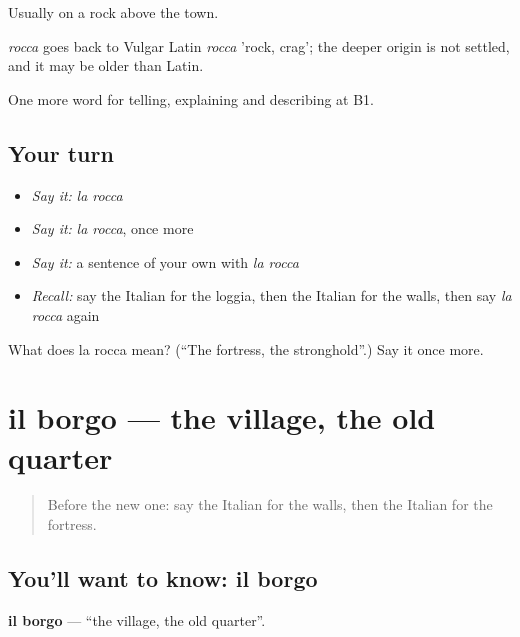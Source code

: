 Usually on a rock above the town.

\begin{cousinweb}
\emph{rocca} goes back to Vulgar Latin \emph{rocca} 'rock, crag'; the deeper origin is not settled, and it may be older than Latin.
\end{cousinweb}

\begin{grammarlens}[title={What you've built}]
One more word for telling, explaining and describing at B1.
\end{grammarlens}

\subsection*{Your turn}
\begin{itemize}
\raggedright
  \item \emph{Say it:} \emph{la rocca}
  \item \emph{Say it:} \emph{la rocca}, once more
  \item \emph{Say it:} a sentence of your own with \emph{la rocca}
  \item \emph{Recall:} say the Italian for the loggia, then the Italian for the walls, then say \emph{la rocca} again
\end{itemize}

\begin{tcolorbox}[breakable,colback=teal!4,colframe=teal!35!black,title={Before you move on}]
What does la rocca mean? (\textquotedblleft{}The fortress, the stronghold\textquotedblright{}.) Say it once more.
\end{tcolorbox}
\section[il borgo]{il borgo — the village, the old quarter}

\label{lesson:IT-C446-borgo}



\begin{quote}
Before the new one: say the Italian for the walls, then the Italian for the fortress.
\end{quote}

\subsection*{You'll want to know: il borgo}
\textbf{il borgo} — \textquotedblleft{}the village, the old quarter\textquotedblright{}.

